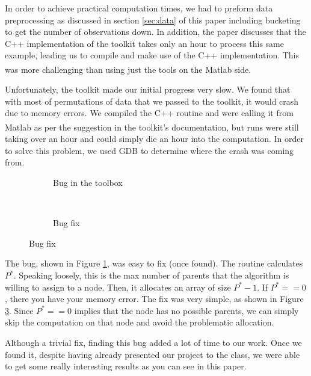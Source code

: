 \documentclass{article}
\begin{document}
In order to achieve practical computation times, we had to preform data 
preprocessing as discussed in section \ref{sec:data} of this paper 
including bucketing to get the number of observations down. In addition, the 
paper discusses that the C++ implementation of the toolkit takes only an hour 
to process this same example, leading us to compile and make use of the C++ 
implementation. This was more challenging than using just the tools on the 
Matlab\textsuperscript{\textregistered} side.\par 

Unfortunately, the toolkit made our initial progress very slow. We found that 
with most of permutations of data that we passed to the toolkit, it would 
crash due to memory errors. We compiled the C++ routine and were calling it 
from Matlab\textsuperscript{\textregistered} as per the suggestion in the 
toolkit's documentation, but runs were still taking over an hour and could 
simply die an hour into the computation. In order to solve this problem, we 
used GDB to determine where the crash was coming from.\par

\begin{figure}[h]
  \centering

  \begin{subfigure}{0.48\textwidth}
    {}
    \caption{Bug in the toolbox} 
    \label{fig:bug}
  \end{subfigure}
  ~
  \begin{subfigure}{0.48\textwidth}
    {}
    \caption{Bug fix}
    \label{fig:bugfix}
  \end{subfigure}

\end{figure}

The bug, shown in Figure \ref{fig:bug}, was easy to fix (once found). The 
routine calculates $P^*$. Speaking loosely, this is the max number 
of parents that the algorithm is willing to assign to a node. Then, it 
allocates an array of size $P^*-1$. If $P^* == 0$, there you have your memory 
error. The fix was very simple, as shown in Figure \ref{fig:bugfix}. Since 
$P^* == 0$ implies that the node has no possible parents, we can simply skip 
the computation on that node and avoid the problematic allocation. \par

Although a trivial fix, finding this bug added a lot of time to our work. Once 
we found it, despite having already presented our project to the class, we 
were able to get some really interesting results as you can see in this 
paper.\par
\end{document}
